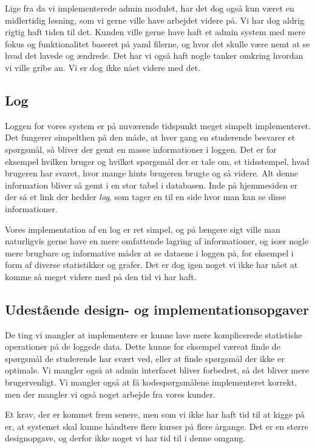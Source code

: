 \documentclass[11pt, a4paper]{article}
\begin{document}
Lige fra da vi implementerede admin modulet, har det dog også kun været en midlertidig løsning, som vi gerne ville have arbejdet videre på. Vi har dog aldrig rigtig haft tiden til det. Kunden ville gerne have haft et admin system med mere fokus og funktionalitet baseret på yaml filerne, og hvor det skulle være nemt at se hvad det lavede og ændrede. Det har vi også haft nogle tanker omkring hvordan vi ville gribe an. Vi er dog ikke nået videre med det.

\subsection{Log}
\label{sub:log}
Loggen for vores system er på nuværende tidspunkt meget simpelt implementeret. Det fungerer simpelthen på den måde, at hver gang en studerende besvarer et spørgsmål, så bliver der gemt en masse informationer i loggen. Det er for eksempel hvilken bruger og hvilket spørgsmål der er tale om, et tidsstempel, hvad brugeren har svaret, hvor mange hints brugeren brugte og så videre. Alt denne information bliver så gemt i en stor tabel i databasen. Inde på hjemmesiden er der så et link der hedder \emph{log}, som tager en til en side hvor man kan se disse informationer.

Vores implementation af en log er ret simpel, og på længere sigt ville man naturligvis gerne have en mere omfattende lagring af informationer, og især nogle mere brugbare og informative måder at se dataene i loggen på, for eksempel i form af diverse statistikker og grafer. Det er dog igen noget vi ikke har nået at komme så meget videre med på den tid vi har haft.

\subsection{Udestående design- og implementationsopgaver}
\label{sub:udestaende_design_og_implementationsopgaver}
De ting vi mangler at implementere er kunne lave mere komplicerede statistiske operationer på de loggede data. Dette kunne for eksempel væreat finde de spørgsmål de studerende har svært ved, eller at finde spørgsmål der ikke er optimale. Vi mangler også at admin interfacet bliver forbedret, så det bliver mere brugervenligt. Vi mangler også at få kodespørgsmålene implementeret korrekt, men der mangler vi også noget arbejde fra vores kunder.

Et krav, der er kommet frem senere, men som vi ikke har haft tid til at kigge på er, at systemet skal kunne håndtere flere kurser på flere årgange. Det er en større designopgave, og derfor ikke noget vi har tid til i denne omgang.
\end{document}
